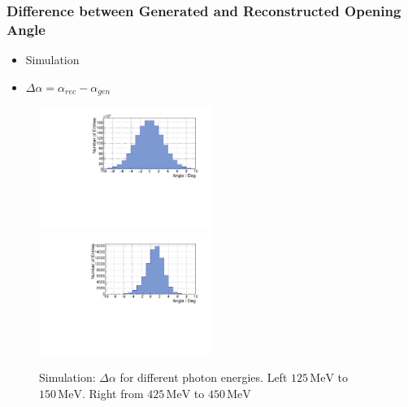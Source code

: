 \documentclass[slidestop,compress,mathserif]{beamer}
\begin{document}
\begin{frame}
	\frametitle{Difference between Generated and Reconstructed Opening Angle}
	
	\begin{itemize}
		\item Simulation
		\item $\Delta \alpha = \alpha_{rec}-\alpha_{gen}$
	\end{itemize}
\begin{figure}
	\includegraphics[width=0.5\textwidth]{Pictures/20172704MCDeviationOpeningAngle125MeV}
	\includegraphics[width=0.5\textwidth]{Pictures/20172704MCDeviationOpeningAngle400MeV}
\caption{Simulation: $\Delta \alpha$ for different photon energies. Left $125\,\text{MeV}$ to $150\,\text{MeV}$. Right from $425\,\text{MeV}$ to $450\,\text{MeV}$}
\end{figure}


\end{frame}
\end{document}
